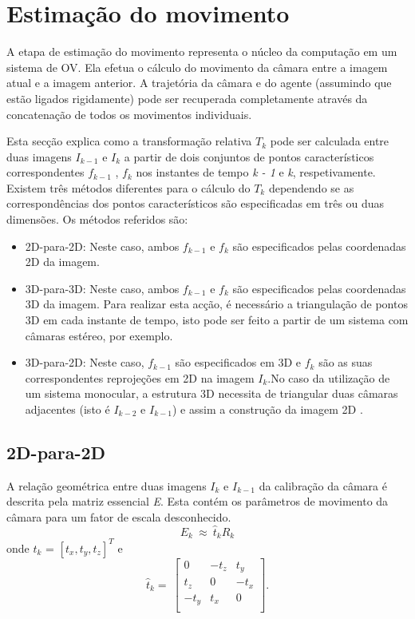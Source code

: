 \section{Estimação do movimento}

A etapa de estimação do movimento representa o núcleo da computação em um sistema de OV. Ela efetua o cálculo do movimento da câmara entre a imagem atual e a imagem anterior. A trajetória da câmara e do agente (assumindo que estão ligados rigidamente) pode ser recuperada completamente através da concatenação de todos os movimentos individuais.

Esta secção explica como a transformação relativa \textit{$T_k$} pode ser calculada entre duas imagens \textit{$I_{k-1}$} e \textit{$I_k$} a partir de dois conjuntos de pontos característicos correspondentes \textit{$f_{k-1}$} , \textit{$f_k$} nos instantes de tempo \textit{k - 1} e \textit{k}, respetivamente. Existem três métodos diferentes para o cálculo do \textit{$T_k$} dependendo se as correspondências dos pontos característicos são especificadas em três ou duas dimensões. Os métodos referidos são:


\begin{itemize}
	\item 2D-para-2D: Neste caso, ambos \textit{$f_{k-1}$} e \textit{$f_k$} são especificados pelas coordenadas 2D da imagem.
	\item 3D-para-3D: Neste caso, ambos \textit{$f_{k-1}$} e \textit{$f_k$} são especificados pelas coordenadas 3D da imagem. Para realizar esta acção, é necessário a triangulação de pontos 3D em cada instante de tempo, isto pode ser feito a partir de um sistema com câmaras estéreo, por exemplo.
	\item 3D-para-2D: Neste caso, \textit{$f_{k-1}$} são especificados em 3D e \textit{$f_k$} são as suas correspondentes reprojeções em 2D na imagem \textit{$I_k$}.No caso da utilização de um sistema monocular, a estrutura 3D necessita de triangular duas câmaras adjacentes (isto é \textit{$I_{k-2}$} e \textit{$I_{k-1}$}) e assim a construção da imagem 2D . 
\end{itemize}



\subsection{2D-para-2D}

A relação geométrica entre duas imagens \textit{$I_k$} e \textit{$I_{k-1}$} da calibração da câmara é descrita pela matriz essencial \textit{E}. Esta contém os parâmetros de movimento da câmara para um fator de escala desconhecido. \[ E_k\ \approx\ {\hat{t}}_kR_k \] onde \textit{$t_k$} = $[ \textit{$t_x$}, \textit{$t_y$}, \textit{$t_z$} ]^T$ e \[ \hat{t}_k =\ \left[\begin{array}{ccc}0&-t_z&t_y\\t_z&0&-t_x\\-t_y&t_x&0\\\end{array}\right] . \]

